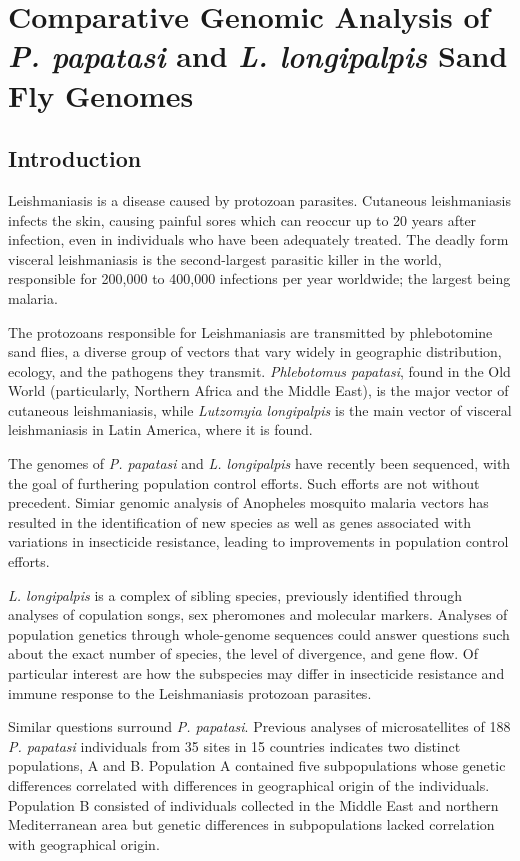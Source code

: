 \chapter{Comparative Genomic Analysis of \emph{P. papatasi} and \emph{L. longipalpis} Sand Fly Genomes}

\section{Introduction}
Leishmaniasis is a disease caused by protozoan parasites.  Cutaneous leishmaniasis infects the skin, causing painful sores which can reoccur up to 20 years after infection, even in individuals who have been adequately treated. The deadly form visceral leishmaniasis is the second-largest parasitic killer in the world, responsible for 200,000 to 400,000 infections per year worldwide; the largest being malaria.

The protozoans responsible for Leishmaniasis are transmitted by phlebotomine sand flies, a diverse group of vectors that vary widely in geographic distribution, ecology, and the pathogens they transmit. \emph{Phlebotomus papatasi}, found in the Old World (particularly, Northern Africa and the Middle East), is the major vector of cutaneous leishmaniasis, while \emph{Lutzomyia longipalpis} is the main vector of visceral leishmaniasis in Latin America, where it is found.

The genomes of \emph{P. papatasi} and \emph{L. longipalpis} have recently been sequenced, with the goal of furthering population control efforts. Such efforts are not without precedent. Simiar genomic analysis of Anopheles mosquito malaria vectors has resulted in the identification of new species as well as genes associated with variations in insecticide resistance, leading to improvements in  population control efforts.

\emph{L. longipalpis} is a complex of sibling species, previously identified through analyses of copulation songs, sex pheromones and molecular markers.  Analyses of population genetics through whole-genome sequences could answer questions such about the exact number of species, the level of divergence, and gene flow.  Of particular interest are how the subspecies may differ in insecticide resistance and immune response to the Leishmaniasis protozoan parasites.

Similar questions surround \emph{P. papatasi}.  Previous analyses of microsatellites of 188 \emph{P. papatasi} individuals from 35 sites in 15 countries indicates two distinct populations, A and B.  Population A contained five subpopulations whose genetic differences correlated with differences in geographical origin of the individuals.  Population B consisted of individuals collected in the Middle East and northern Mediterranean area but genetic differences in subpopulations lacked correlation with geographical origin.

